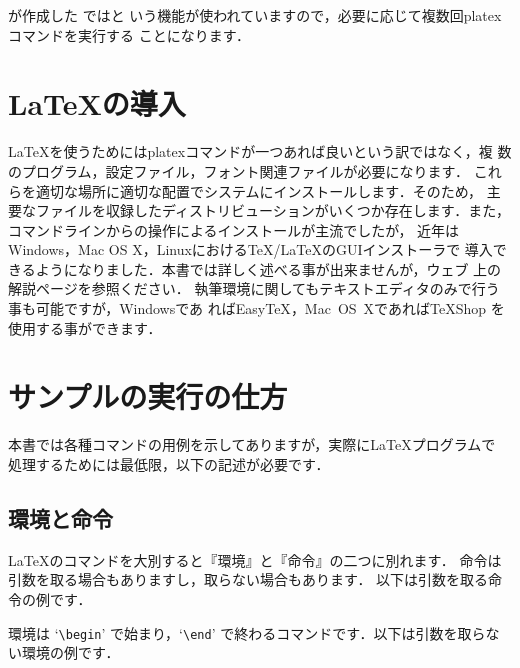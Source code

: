 \JBibTeX が作成した  ではと
いう機能が使われていますので，必要に応じて複数回platexコマンドを実行する
ことになります．

\section{\LaTeX の導入}
\LaTeX を使うためにはplatexコマンドが一つあれば良いという訳ではなく，複
数のプログラム，設定ファイル，フォント関連ファイルが必要になります．
これらを適切な場所に適切な配置でシステムにインストールします．そのため，
主要なファイルを収録したディストリビューションがいくつか存在します．また，
コマンドラインからの操作によるインストールが主流でしたが，
近年はWindows，Mac OS X，Linuxにおける\TeX/\LaTeX のGUIインストーラで
導入できるようになりました．本書では詳しく述べる事が出来ませんが，ウェブ
上の解説ページを参照ください．
執筆環境に関してもテキストエディタのみで行う事も可能ですが，Windowsであ
れば{Easy\TeX}，Mac~OS~Xであれば\TeX Shop を使用する事ができます．


\section{サンプルの実行の仕方}
本書では各種コマンドの用例を示してありますが，実際に\LaTeX プログラムで
処理するためには最低限，以下の記述が必要です．


\subsection{環境と命令}
%
%
\LaTeX のコマンドを大別すると『環境』と『命令』の二つに別れます．
命令は引数を取る場合もありますし，取らない場合もあります．
以下は引数を取る命令の例です．


環境は `\verb|\begin|' で始まり，`\verb|\end|'
で終わるコマンドです．以下は引数を取らない環境の例です．


